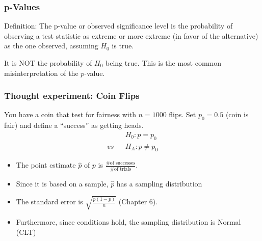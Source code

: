 \documentclass[slides]{beamer}
\newcommand{\blue}[1]{\textcolor{blue2}{#1}}
\begin{document}
\begin{frame}
\frametitle{p-Values}
%
%
Definition:  The \blue{p-value} or \blue{observed significance level} is the probability of observing a test statistic as extreme or more extreme (in favor of the alternative) as the one observed, assuming $H_0$ is true.

\vspace{0.5cm}

\pause It is \blue{NOT} the probability of $H_0$ being true.  This is the most common misinterpretation of the $p$-value.

\end{frame}


\begin{frame}
\frametitle{Thought experiment: Coin Flips}
%
%
You have a coin that test for fairness with $n=1000$ flips.  Set $p_0 = 0.5$ (coin is fair) and define a ``success'' as getting heads.
\begin{eqnarray*}
&& H_0: p = p_0\\
vs && H_A: p \neq p_0
\end{eqnarray*}

\begin{itemize}
\pause \item The point estimate $\widehat{p}$ of $p$ is $\frac{\mbox{\# of successes}}{\mbox{\# of trials}}$.
\pause \item Since it is based on a sample, $\widehat{p}$ has a sampling distribution
\pause \item The standard error is $\sqrt{\frac{p(1-p)}{n}}$ (Chapter 6).
\pause \item Furthermore, since conditions hold, the sampling distribution is Normal (CLT)
\end{itemize}
\end{frame}
\end{document}
